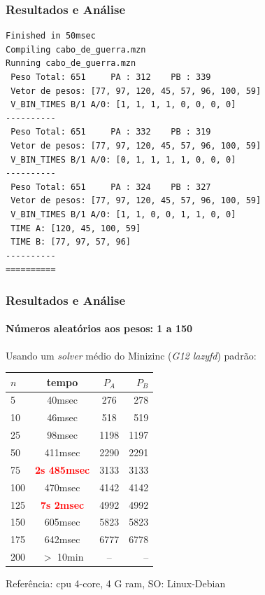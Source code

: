 \documentclass{beamer}
\begin{document}
\begin{frame}[fragile]
\frametitle{Resultados e Análise}

\begin{footnotesize}
\begin{verbatim}
Finished in 50msec
Compiling cabo_de_guerra.mzn
Running cabo_de_guerra.mzn
 Peso Total: 651	 PA : 312	 PB : 339
 Vetor de pesos: [77, 97, 120, 45, 57, 96, 100, 59]
 V_BIN_TIMES B/1 A/0: [1, 1, 1, 1, 0, 0, 0, 0]
----------
 Peso Total: 651	 PA : 332	 PB : 319
 Vetor de pesos: [77, 97, 120, 45, 57, 96, 100, 59]
 V_BIN_TIMES B/1 A/0: [0, 1, 1, 1, 1, 0, 0, 0]
----------
 Peso Total: 651	 PA : 324	 PB : 327
 Vetor de pesos: [77, 97, 120, 45, 57, 96, 100, 59]
 V_BIN_TIMES B/1 A/0: [1, 1, 0, 0, 1, 1, 0, 0]
 TIME A: [120, 45, 100, 59]
 TIME B: [77, 97, 57, 96]
----------
==========
\end{verbatim}

\end{footnotesize}

\end{frame}
\begin{frame}[fragile]
\frametitle{Resultados e Análise}
\framesubtitle{Números aleatórios aos pesos: 1 a 150}
\begin{block}{
Usando um \textit{solver} médio do Minizinc (\textit{G12 lazyfd}) padrão:}
\begin{small}
\begin{center}
  \begin{tabular}{ l | c |c | r }
    \hline  \hline 
    $n$ & tempo & $P_A$ & $P_B$\\ \hline     \hline 
     5 & 40msec & 276 & 278 \\ \hline
    10 & 46msec & 518 & 519 \\ \hline
    25 & 98msec & 1198 & 1197 \\ \hline
    50 & 411msec & 2290 & 2291 \\ \hline
    75 & \textbf{\textcolor{red}{2s 485msec}} & 3133 & 3133 \\ \hline
    100 & 470msec & 4142 & 4142 \\ \hline 
    125 & \textbf{\textcolor{red}{7s 2msec}} & 4992 & 4992 \\ \hline 
    150 & 605msec & 5823 & 5823 \\ \hline 
    175 & 642msec &   6777 &  6778 \\ \hline 
    200 & $>$ 10min & -- & -- \\ \hline \hline
  \end{tabular}
\end{center}
\end{small}
Referência: cpu 4-core, 4 G ram, SO: Linux-Debian

\end{block}
\end{frame}
\end{document}
